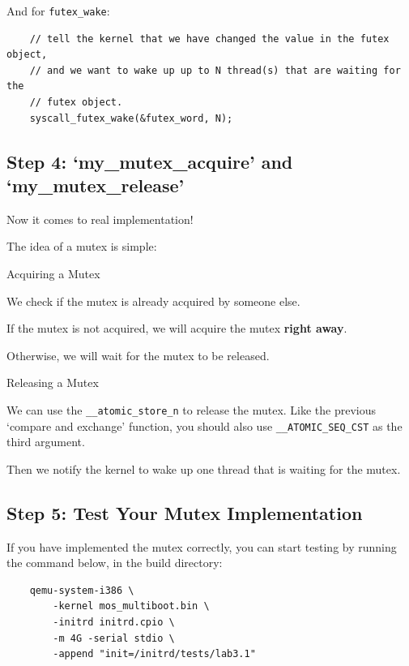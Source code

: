 And for \texttt{futex\_wake}:

\begin{verbatim}
    // tell the kernel that we have changed the value in the futex object,
    // and we want to wake up up to N thread(s) that are waiting for the
    // futex object.
    syscall_futex_wake(&futex_word, N);
\end{verbatim}

\subsection{Step 4: `my\_mutex\_acquire' and `my\_mutex\_release'}

Now it comes to real implementation!

The idea of a mutex is simple:

\begin{tip*}{Acquiring a Mutex}
    \item We check if the mutex is already acquired by someone else.
    \item If the mutex is not acquired, we will acquire the mutex \textbf{right away}.
    \item Otherwise, we will wait for the mutex to be released.
\end{tip*}

\begin{tip*}{Releasing a Mutex}
    \item We can use the \texttt{\_\_atomic\_store\_n} to release the mutex.
    Like the previous `compare and exchange' function, you should also use
    \texttt{\_\_ATOMIC\_SEQ\_CST} as the third argument.
    \item Then we notify the kernel to wake up one thread that is waiting for the mutex.
\end{tip*}

\subsection{Step 5: Test Your Mutex Implementation}

If you have implemented the mutex correctly, you can start testing by running the command
below, in the build directory:

\begin{verbatim}
    qemu-system-i386 \
        -kernel mos_multiboot.bin \
        -initrd initrd.cpio \
        -m 4G -serial stdio \
        -append "init=/initrd/tests/lab3.1"
\end{verbatim}

